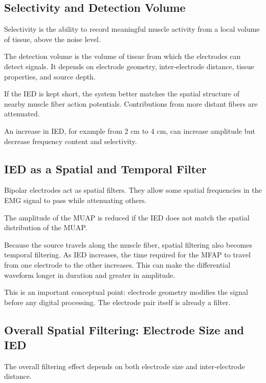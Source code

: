 \subsection{Selectivity and Detection Volume}

Selectivity is the ability to record meaningful muscle activity from a local volume of tissue, above the noise level.

The detection volume is the volume of tissue from which the electrodes can detect signals. It depends on electrode geometry, inter-electrode distance, tissue properties, and source depth.

If the IED is kept short, the system better matches the spatial structure of nearby muscle fiber action potentials. Contributions from more distant fibers are attenuated.

An increase in IED, for example from 2 cm to 4 cm, can increase amplitude but decrease frequency content and selectivity.

\subsection{IED as a Spatial and Temporal Filter}

Bipolar electrodes act as spatial filters. They allow some spatial frequencies in the EMG signal to pass while attenuating others.

The amplitude of the MUAP is reduced if the IED does not match the spatial distribution of the MUAP.

Because the source travels along the muscle fiber, spatial filtering also becomes temporal filtering. As IED increases, the time required for the MFAP to travel from one electrode to the other increases. This can make the differential waveform longer in duration and greater in amplitude.

\begin{authornote}
This is an important conceptual point: electrode geometry modifies the signal before any digital processing. The electrode pair itself is already a filter.
\end{authornote}

\subsection{Overall Spatial Filtering: Electrode Size and IED}

The overall filtering effect depends on both electrode size and inter-electrode distance.

